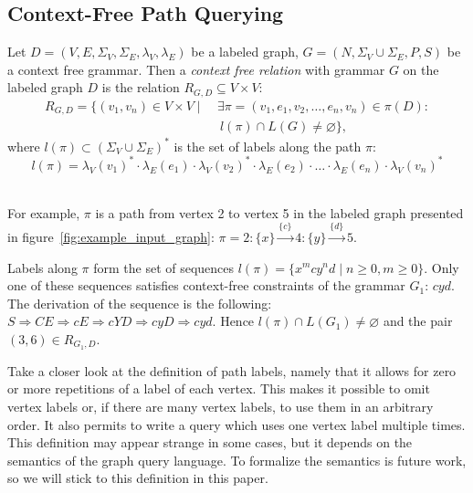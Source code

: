 \subsection{Context-Free Path Querying}

\begin{definition}
Let $D = (V, E, \Sigma_V, \Sigma_E, \lambda_V, \lambda_E)$ be a labeled graph, $G = (N, \Sigma_V \cup \Sigma_E, P, S)$ be a context free grammar. Then a \emph{context free relation} with grammar $G$ on the labeled graph $D$ is the relation $R_{G, D} \subseteq V \times V$:
\begin{equation*} \label{eq1}
\begin{split}
R_{G, D} = \{(v_1, v_n) \in V \times V  \mid \ &\exists \pi = (v_1, e_1, v_2, \ldots, e_n, v_n) \in \pi(D): \\
      &\ l(\pi) \cap L(G) \neq \varnothing \},
\end{split}
\end{equation*}
where $l(\pi) \subset (\Sigma_V \cup \Sigma_E)^*$ is the set of labels along the path $\pi$:
$$l(\pi) = \lambda_V(v_1)^* \cdot \lambda_E(e_1) \cdot \lambda_V(v_2)^* \cdot \lambda_E(e_2) \cdot \ldots \cdot \lambda_E(e_n) \cdot \lambda_V(v_n)^*$$
\
\end{definition}

For example, $\pi$ is a path from vertex 2 to vertex 5 in the labeled graph presented in figure~\ref{fig:example_input_graph}:
$\pi=2:\{x\}\xrightarrow{\{c\}} 4:\{y\} \xrightarrow{\{d\}} 5.$

Labels along $\pi$ form the set of sequences $l(\pi) = \{x^mcy^nd \mid n \geq 0, m \geq 0\}$.
Only one of these sequences satisfies context-free constraints of the grammar $G_1$: $cyd$.
The derivation of the sequence is the following:
    $
         S \Rightarrow CE \Rightarrow cE \Rightarrow cYD \Rightarrow cyD \Rightarrow cyd
    $.
Hence $l(\pi) \cap L(G_1) \neq \varnothing$ and the pair $(3,6) \in R_{G_1, D}$.

Take a closer look at the definition of path labels, namely that it allows for zero or more repetitions of a label of each vertex.
This makes it possible to omit vertex labels or, if there are many vertex labels, to use them in an arbitrary order.
It also permits to write a query which uses one vertex label multiple times.
This definition may appear strange in some cases, but it depends on the semantics of the graph query language.
To formalize the semantics is future work, so we will stick to this definition in this paper.

